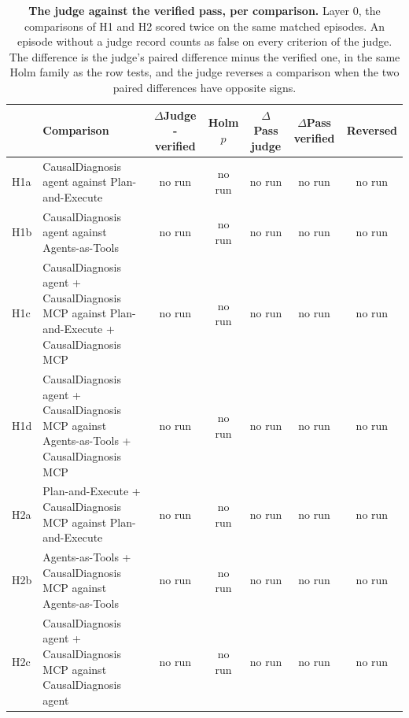 \documentclass[10pt]{article}
\begin{document}
\vspace{-8pt}
\begin{table}[H]\centering\footnotesize
\caption{\textbf{The judge against the verified pass, per comparison.} Layer 0, the comparisons of H1 and H2 scored twice on the same matched episodes. An episode without a judge record counts as false on every criterion of the judge. The difference is the judge's paired difference minus the verified one, in the same Holm family as the row tests, and the judge reverses a comparison when the two paired differences have opposite signs.}
\label{tab:judgecmp}
\setlength{\tabcolsep}{3pt}
\begin{tabular}{l>{\raggedright\arraybackslash}p{6.4cm}ccccc}
\toprule
 & Comparison & $\Delta$Judge - verified & Holm $p$ & $\Delta$Pass judge & $\Delta$Pass verified & Reversed \\
\midrule
H1a & CausalDiagnosis agent against Plan-and-Execute & no run & no run & no run & no run & no run \\
H1b & CausalDiagnosis agent against Agents-as-Tools & no run & no run & no run & no run & no run \\
H1c & CausalDiagnosis agent + CausalDiagnosis MCP against Plan-and-Execute + CausalDiagnosis MCP & no run & no run & no run & no run & no run \\
H1d & CausalDiagnosis agent + CausalDiagnosis MCP against Agents-as-Tools + CausalDiagnosis MCP & no run & no run & no run & no run & no run \\
H2a & Plan-and-Execute + CausalDiagnosis MCP against Plan-and-Execute & no run & no run & no run & no run & no run \\
H2b & Agents-as-Tools + CausalDiagnosis MCP against Agents-as-Tools & no run & no run & no run & no run & no run \\
H2c & CausalDiagnosis agent + CausalDiagnosis MCP against CausalDiagnosis agent & no run & no run & no run & no run & no run \\
\bottomrule
\end{tabular}
\end{table}
\vspace{-8pt}
\end{document}
